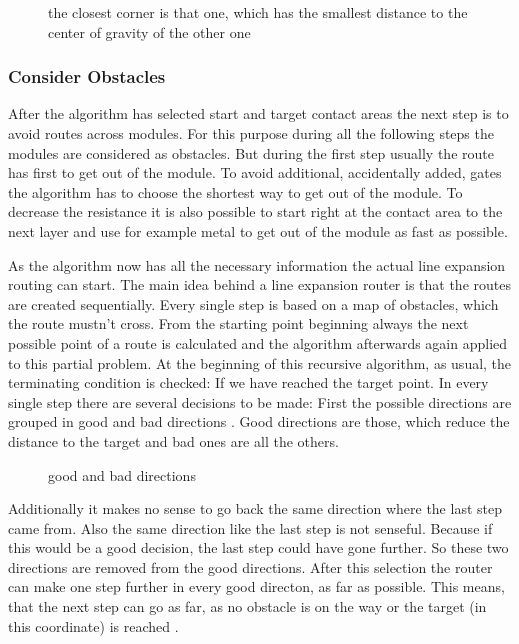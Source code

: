 \begin{figure}
	\centering
	
  	\caption{the closest corner is that one, which has the smallest distance to the center of gravity of the other one}
	\label{fig:rectangles_closest_corner}
\end{figure}

\subsubsection{Consider Obstacles}
After the algorithm has selected start and target contact areas the next step is to avoid routes across modules. For this purpose during all the following steps the modules are considered as obstacles. But during the first step usually the route has first to get out of the module. To avoid additional, accidentally added, gates the algorithm has to choose the shortest way to get out of the module. To decrease the resistance it is also possible to start right at the contact area to the next layer and use for example metal to get out of the module as fast as possible.

As the algorithm now has all the necessary information the actual line expansion routing can start. The main idea behind a line expansion router is that the routes are created sequentially. Every single step is based on a map of obstacles, which the route mustn't cross. From the starting point beginning always the next possible point of a route is calculated and the algorithm afterwards again applied to this partial problem. At the beginning of this recursive algorithm, as usual, the terminating condition is checked: If we have reached the target point. In every single step there are several decisions to be made: First the possible directions are grouped in good and bad directions . Good directions are those, which reduce the distance to the target and bad ones are all the others.

\begin{figure}
	\centering
	
  	\caption{good and bad directions}
	\label{fig:router_good_bad_direction}
\end{figure}

Additionally it makes no sense to go back the same direction where the last step came from. Also the same direction like the last step is not senseful. Because if this would be a good decision, the last step could have gone further. So these two directions are removed from the good directions. After this selection the router can make one step further in every good directon, as far as possible. This means, that the next step can go as far, as no obstacle is on the way or the target (in this coordinate) is reached .

